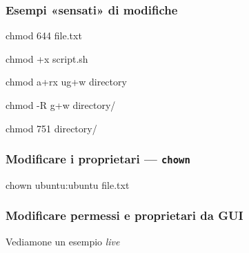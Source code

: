 \documentclass{beamer}
\newenvironment{shell*}{\par\vspace{.5em}\begin{beamercolorbox}[rounded=true,sep=.2em]{shell snippet}\ttfamily {\color{red}\#}}{\end{beamercolorbox}}
\begin{document}
\begin{frame}
  \frametitle{Esempi «sensati» di modifiche}
  \begin{shell*}
    chmod 644 file.txt
  \end{shell*}

  \begin{shell*}
    chmod +x script.sh
  \end{shell*}

  \begin{shell*}
    chmod a+rx ug+w directory
  \end{shell*}

  \begin{shell*}
    chmod -R g+w directory/
  \end{shell*}

  \begin{shell*}
    chmod 751 directory/
  \end{shell*}
\end{frame}

\begin{frame}
  \frametitle{Modificare i proprietari --- \texttt{chown}}

  \begin{shell*}
    chown \alert<2>{ubuntu}:\alert<3>{ubuntu} file.txt
  \end{shell*}
  
\end{frame}

\begin{frame}
  \frametitle{Modificare permessi e proprietari da GUI}
  
  Vediamone un esempio \textit{live}
\end{frame}
\end{document}
